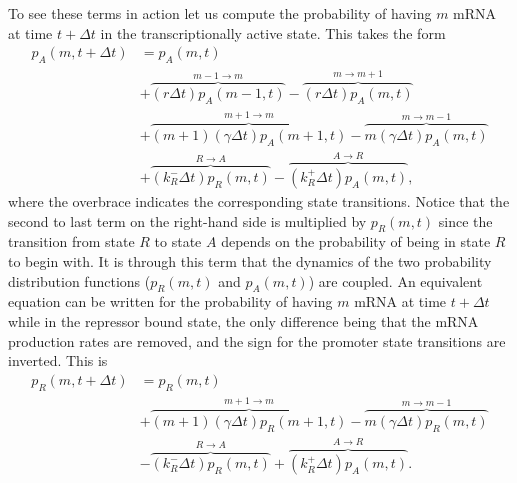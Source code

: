 To see these terms in action let us compute the probability of having $m$ mRNA
at time $t + \Delta t$ in the transcriptionally active state. This takes the 
form
\begin{equation}
\begin{aligned}
p_A(m, t + \Delta t) &= p_A(m, t) \\
&+ \overbrace{(r\Delta t) p_A(m-1, t)}^{m-1 \rightarrow m}
- \overbrace{(r\Delta t) p_A(m, t)}^{m \rightarrow m+1}\\
&+ \overbrace{(m+1)(\gamma \Delta t) p_A(m+1, t)}^{m+1 \rightarrow m}
- \overbrace{m(\gamma \Delta t) p_A(m, t)}^{m \rightarrow m-1}\\
&+\overbrace{(k_R^- \Delta t) p_R(m, t)}^{R \rightarrow A}
-\overbrace{(k_R^+ \Delta t) p_A(m, t)}^{A \rightarrow R},
\end{aligned}
\end{equation}
where the overbrace indicates the corresponding state transitions. Notice that
the second to last term on the right-hand side is multiplied by $p_R(m, t)$
since the transition from state $R$ to state $A$ depends on the probability of
being in state $R$ to begin with. It is through this term that the dynamics of
the two probability distribution functions ($p_R(m,t)$ and $p_A(m,t)$) are
coupled. An equivalent equation can be written for the probability of having $m$
mRNA at time $t + \Delta t$ while in the repressor bound state, the only
difference being that the mRNA production rates are removed, and the sign for
the promoter state transitions are inverted. This is
\begin{equation}
\begin{aligned}
p_R(m, t + \Delta t) &= p_R(m, t) \\
&+ \overbrace{(m+1)(\gamma \Delta t) p_R(m+1, t)}^{m+1 \rightarrow m}
- \overbrace{m(\gamma \Delta t) p_R(m, t)}^{m \rightarrow m-1}\\
&-\overbrace{(k_R^- \Delta t) p_R(m, t)}^{R \rightarrow A}
+\overbrace{(k_R^+ \Delta t) p_A(m, t)}^{A \rightarrow R}.
\end{aligned}
\end{equation}

